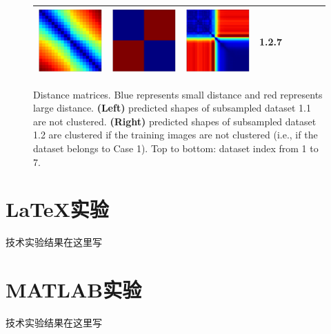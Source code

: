 \documentclass[bachelor, nocolorlinks, printoneside]{seuthesis} %
\begin{document}
\begin{Main}
\begin{figure}[ht!]
\begin{centering}
\begin{tabular}{cccc|cccc}
        \includegraphics[width=0.12\columnwidth,keepaspectratio]{figs/toyset_matrices/cluster_2by10_7_1.png} &
        \includegraphics[width=0.12\columnwidth,keepaspectratio]{figs/toyset_matrices/cluster_2by10_7_2.png} &
        \includegraphics[width=0.12\columnwidth,keepaspectratio]{figs/toyset_matrices/cluster_2by10_7_3.png} & 1.2.7\\
        \bottomrule  
        \end{tabular}  \vspace{-2mm}
        \caption{\small Distance matrices. Blue represents small distance and red represents large distance. {\bf (Left)} predicted shapes of subsampled dataset 1.1 are not clustered. {\bf (Right)} predicted shapes of subsampled dataset 1.2 are clustered if the training images are not clustered (i.e., if the dataset belongs to Case 1). Top to bottom: dataset index from 1 to 7.}
        \label{fig:cluster_visualization}
    \end{centering}
    \end{figure}


\end{Main} %




\begin{Appendix}{}
    \chapter{{\LaTeX}实验}
    技术实验结果在这里写
    \chapter{MATLAB实验}
    技术实验结果在这里写
\end{Appendix}
\end{document}
